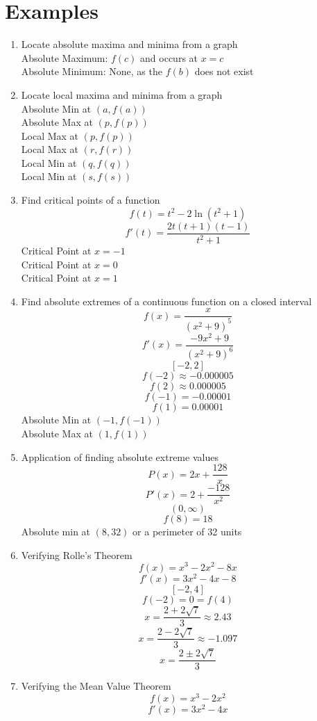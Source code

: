 \documentclass{article}
\begin{document}
\section*{Examples}
\begin{enumerate}
    \item Locate absolute maxima and minima from a graph \\
    Absolute Maximum: $f(c)$ and occurs at $x = c$ \\
    Absolute Minimum: None, as the $f(b)$ does not exist
    \item Locate local maxima and minima from a graph \\
    Absolute Min at $(a, f(a))$ \\
    Absolute Max at $(p, f(p))$ \\
    Local Max at $(p, f(p))$ \\
    Local Max at $(r, f(r))$ \\
    Local Min at $(q, f(q))$ \\
    Local Min at $(s, f(s))$
    \item Find critical points of a function
    $$f(t) = t^2 - 2\ln{\left(t^2 + 1\right)}$$
    $$f'(t) = \frac{2t\left(t+1\right)\left(t-1\right)}{t^2 + 1}$$
    Critical Point at $x = -1$ \\
    Critical Point at $x = 0$ \\
    Critical Point at $x = 1$
    \item Find absolute extremes of a continuous function on a closed interval
    $$f(x) = \frac{x}{\left(x^2 + 9\right)^5}$$
    $$f'(x) = \frac{-9x^2 + 9}{\left(x^2 + 9\right)^6}$$
    $$[-2, 2]$$
    $$f(-2) \approx -0.000005$$
    $$f(2) \approx 0.000005$$
    $$f(-1) = -0.00001$$
    $$f(1) = 0.00001$$
    Absolute Min at $(-1, f(-1))$ \\
    Absolute Max at $(1, f(1))$
    \item Application of finding absolute extreme values
    $$P(x) = 2x + \frac{128}{x}$$
    $$P'(x) = 2 + \frac{-128}{x^2}$$
    $$(0, \infty)$$
    $$f(8) = 18$$
    Absolute min at $(8, 32)$ or a perimeter of 32 units
    \item Verifying Rolle's Theorem
    $$f(x) = x^3 - 2x^2 - 8x$$
    $$f'(x) = 3x^2 - 4x - 8$$
    $$[-2, 4]$$
    $$f(-2) = 0 = f(4)$$
    $$x = \frac{2 + 2\sqrt{7}}{3} \approx 2.43$$
    $$x = \frac{2 - 2\sqrt{7}}{3} \approx -1.097$$
    $$x = \frac{2 \pm 2\sqrt{7}}{3}$$
    \item Verifying the Mean Value Theorem
    $$f(x) = x^3 - 2x^2$$
    $$f'(x) = 3x^2 - 4x$$

\end{enumerate}
\end{document}
